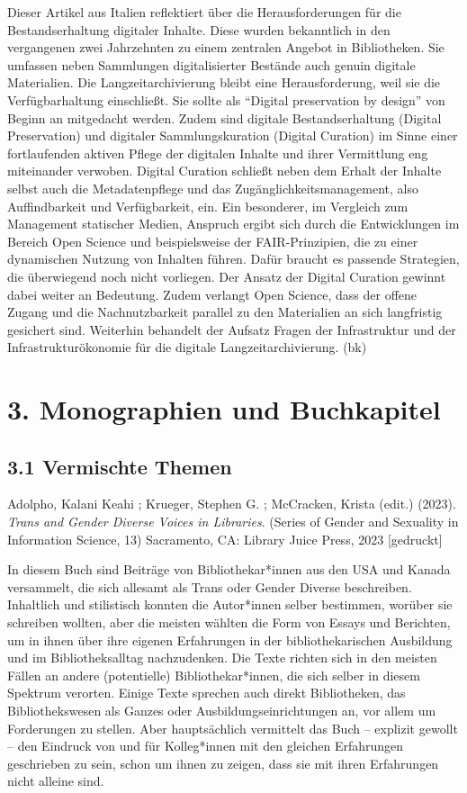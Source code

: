 \documentclass[a4paper,
fontsize=11pt,
oneside,
numbers=noperiodatend,
parskip=half-,
bibliography=totoc,
final
]{scrartcl}
\begin{document}
Dieser Artikel aus Italien reflektiert über die Herausforderungen für
die Bestandserhaltung digitaler Inhalte. Diese wurden bekanntlich in den
vergangenen zwei Jahrzehnten zu einem zentralen Angebot in Bibliotheken.
Sie umfassen neben Sammlungen digitalisierter Bestände auch genuin
digitale Materialien. Die Langzeitarchivierung bleibt eine
Herausforderung, weil sie die Verfügbarhaltung einschließt. Sie sollte
als ``Digital preservation by design'' von Beginn an mitgedacht werden.
Zudem sind digitale Bestandserhaltung (Digital Preservation) und
digitaler Sammlungskuration (Digital Curation) im Sinne einer
fortlaufenden aktiven Pflege der digitalen Inhalte und ihrer Vermittlung
eng miteinander verwoben. Digital Curation schließt neben dem Erhalt der
Inhalte selbst auch die Metadatenpflege und das
Zugänglichkeitsmanagement, also Auffindbarkeit und Verfügbarkeit, ein.
Ein besonderer, im Vergleich zum Management statischer Medien, Anspruch
ergibt sich durch die Entwicklungen im Bereich Open Science und
beispielsweise der FAIR-Prinzipien, die zu einer dynamischen Nutzung von
Inhalten führen. Dafür braucht es passende Strategien, die überwiegend
noch nicht vorliegen. Der Ansatz der Digital Curation gewinnt dabei
weiter an Bedeutung. Zudem verlangt Open Science, dass der offene Zugang
und die Nachnutzbarkeit parallel zu den Materialien an sich langfristig
gesichert sind. Weiterhin behandelt der Aufsatz Fragen der Infrastruktur
und der Infrastrukturökonomie für die digitale Langzeitarchivierung.
(bk)

\section{3. Monographien und
Buchkapitel}\label{monographien-und-buchkapitel}

\subsection{3.1 Vermischte Themen}\label{vermischte-themen-1}

Adolpho, Kalani Keahi ; Krueger, Stephen G. ; McCracken, Krista (edit.)
(2023). \emph{Trans and Gender Diverse Voices in Libraries}. (Series of
Gender and Sexuality in Information Science, 13) Sacramento, CA: Library
Juice Press, 2023 {[}gedruckt{]}

In diesem Buch sind Beiträge von Bibliothekar*innen aus den USA und
Kanada versammelt, die sich allesamt als Trans oder Gender Diverse
beschreiben. Inhaltlich und stilistisch konnten die Autor*innen selber
bestimmen, worüber sie schreiben wollten, aber die meisten wählten die
Form von Essays und Berichten, um in ihnen über ihre eigenen Erfahrungen
in der bibliothekarischen Ausbildung und im Bibliotheksalltag
nachzudenken. Die Texte richten sich in den meisten Fällen an andere
(potentielle) Bibliothekar*innen, die sich selber in diesem Spektrum
verorten. Einige Texte sprechen auch direkt Bibliotheken, das
Bibliothekswesen als Ganzes oder Ausbildungseinrichtungen an, vor allem
um Forderungen zu stellen. Aber hauptsächlich vermittelt das Buch --
explizit gewollt -- den Eindruck von und für Kolleg*innen mit den
gleichen Erfahrungen geschrieben zu sein, schon um ihnen zu zeigen, dass
sie mit ihren Erfahrungen nicht alleine sind.
\end{document}
